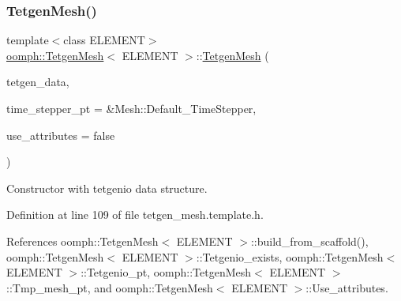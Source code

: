 \subsubsection{\texorpdfstring{Tetgen\+Mesh()}{TetgenMesh()}\hspace{0.1cm}{\footnotesize\ttfamily [3/6]}}
{\footnotesize\ttfamily template$<$class E\+L\+E\+M\+E\+NT$>$ \\
\hyperlink{classoomph_1_1TetgenMesh}{oomph\+::\+Tetgen\+Mesh}$<$ E\+L\+E\+M\+E\+NT $>$\+::\hyperlink{classoomph_1_1TetgenMesh}{Tetgen\+Mesh} (\begin{DoxyParamCaption}\item[{tetgenio \&}]{tetgen\+\_\+data,  }\item[{Time\+Stepper $\ast$}]{time\+\_\+stepper\+\_\+pt = {\ttfamily \&Mesh\+:\+:Default\+\_\+TimeStepper},  }\item[{const bool \&}]{use\+\_\+attributes = {\ttfamily false} }\end{DoxyParamCaption})\hspace{0.3cm}{\ttfamily [inline]}}



Constructor with tetgenio data structure. 



Definition at line 109 of file tetgen\+\_\+mesh.\+template.\+h.



References oomph\+::\+Tetgen\+Mesh$<$ E\+L\+E\+M\+E\+N\+T $>$\+::build\+\_\+from\+\_\+scaffold(), oomph\+::\+Tetgen\+Mesh$<$ E\+L\+E\+M\+E\+N\+T $>$\+::\+Tetgenio\+\_\+exists, oomph\+::\+Tetgen\+Mesh$<$ E\+L\+E\+M\+E\+N\+T $>$\+::\+Tetgenio\+\_\+pt, oomph\+::\+Tetgen\+Mesh$<$ E\+L\+E\+M\+E\+N\+T $>$\+::\+Tmp\+\_\+mesh\+\_\+pt, and oomph\+::\+Tetgen\+Mesh$<$ E\+L\+E\+M\+E\+N\+T $>$\+::\+Use\+\_\+attributes.

\mbox{\label{classoomph_1_1TetgenMesh_a867b3f70bd0f5063901720d04f28e95e}} 
